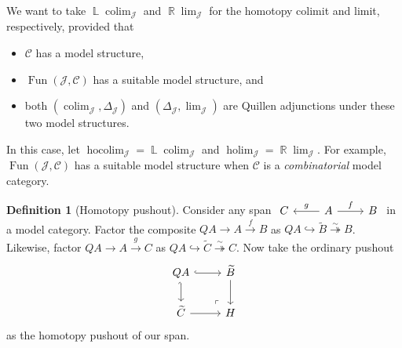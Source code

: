 \documentclass[10pt,letterpaper,cm]{nupset}
\theoremstyle{definition}
\newtheorem{defn}{Definition}[subsection]
\theoremstyle{theorem}
\theoremstyle{remark}
\DeclareMathOperator{\Ll}{\mathbb L}
\DeclareMathOperator{\R}{\mathbb{R}}
\newcommand{\1}{\mathbb{1}}
\renewcommand{\c}{\mathcal{C}}
\renewcommand{\j}{\mathcal{J}}
\newcommand{\0}{\vec 0}
\DeclareMathOperator{\fun}{Fun}
\DeclareMathOperator{\colim}{colim}
\DeclareMathOperator{\hocolim}{hocolim}
\DeclareMathOperator{\holim}{holim}
\newcommand{\bi}{\begin{itemize}}
\newcommand{\ei}{\end{itemize}}
\begin{document}
\medskip

We want to take $\Ll{\colim_{\j}}$ and $\R{\lim_{\j}}$ for the homotopy colimit and limit, respectively, provided that 
\bi
\item $\c$ has a model structure,
\item $\fun(\j, \c)$ has a suitable model structure, and
\item both $\left(\colim_{\j}, \Delta_{\j}\right)$ and $\left(\Delta_{\j}, \lim_{\j}\right)$ are Quillen adjunctions under these two model structures. 
\ei
In this case, let $\hocolim_{\j} = \Ll{\colim_{\j}}$ and $\holim_{\j} = \R{\lim_{\j}}$. For example, $\fun(\j, \c)$ has a suitable model structure when $\c$ is a \textit{combinatorial} model category. 

\begin{defn}[Homotopy pushout]
Consider any span $\begin{tikzcd}
	C & A & B
	\arrow["g"', from=1-2, to=1-1]
	\arrow["f", from=1-2, to=1-3]
\end{tikzcd}$
in a model category. Factor the composite $Q{A}\to  A \xrightarrow{f} B$ as $Q{A} \hookrightarrow \widetilde{B} \overset{\sim}{\twoheadrightarrow} B$. Likewise, factor $Q{A} \to A \xrightarrow{g} C$   as
$Q{A} \hookrightarrow \widetilde{C} \overset{\sim}{\twoheadrightarrow} C$. Now take the ordinary pushout
\[
\begin{tikzcd}
	{Q{A}} & {\widetilde{B}} \\
	{\widetilde{C}} & H
	\arrow[hook, from=1-1, to=1-2]
	\arrow[hook', from=1-1, to=2-1]
	\arrow[from=2-1, to=2-2]
	\arrow[from=1-2, to=2-2]
	\arrow["\lrcorner"{anchor=center, pos=0.125, rotate=180}, draw=none, from=2-2, to=1-1]
\end{tikzcd}
\] as the homotopy pushout  of our span.
\end{defn}
\end{document}
